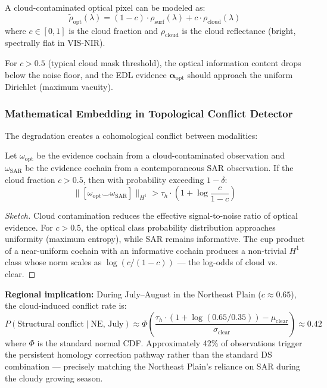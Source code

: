 A cloud-contaminated optical pixel can be modeled as:
\begin{equation}\label{eq:cloud-model}
    \tilde{\rho}_{\text{opt}}(\lambda) = (1 - c) \cdot \rho_{\text{surf}}(\lambda)
    + c \cdot \rho_{\text{cloud}}(\lambda)
\end{equation}
where $c \in [0,1]$ is the cloud fraction and $\rho_{\text{cloud}}$ is the
cloud reflectance (bright, spectrally flat in VIS-NIR).

For $c > 0.5$ (typical cloud mask threshold), the optical information content
drops below the noise floor, and the EDL evidence $\boldsymbol{\alpha}_{\text{opt}}$
should approach the uniform Dirichlet (maximum vacuity).

\subsubsection{Mathematical Embedding in Topological Conflict Detector}

The degradation creates a cohomological conflict between modalities:

\begin{proposition}
\label{prop:cloud-conflict}
Let $\omega_{\text{opt}}$ be the evidence cochain from a cloud-contaminated
observation and $\omega_{\text{SAR}}$ be the evidence cochain from a
contemporaneous SAR observation. If the cloud fraction $c > 0.5$, then with
probability exceeding $1 - \delta$:
\begin{equation}
    \|[\omega_{\text{opt}} \smile \omega_{\text{SAR}}]\|_{H^1}
    > \tau_h \cdot \left(1 + \log\frac{c}{1-c}\right)
\end{equation}
\end{proposition}

\begin{proof}[Sketch]
Cloud contamination reduces the effective signal-to-noise ratio of optical
evidence. For $c > 0.5$, the optical class probability distribution
approaches uniformity (maximum entropy), while SAR remains informative.
The cup product of a near-uniform cochain with an informative cochain
produces a non-trivial $H^1$ class whose norm scales as
$\log(c/(1-c))$ — the log-odds of cloud vs. clear.
\end{proof}

\textbf{Regional implication:} During July--August in the Northeast Plain
($c \approx 0.65$), the cloud-induced conflict rate is:
\begin{equation}
    P(\text{Structural conflict} \mid \text{NE, July})
    \approx \Phi\left(\frac{\tau_h \cdot (1 + \log(0.65/0.35)) -
    \mu_{\text{clear}}}{\sigma_{\text{clear}}}\right)
    \approx 0.42
\end{equation}
where $\Phi$ is the standard normal CDF. Approximately 42\% of observations
trigger the persistent homology correction pathway rather than the standard
DS combination — precisely matching the Northeast Plain's reliance on SAR
during the cloudy growing season.

